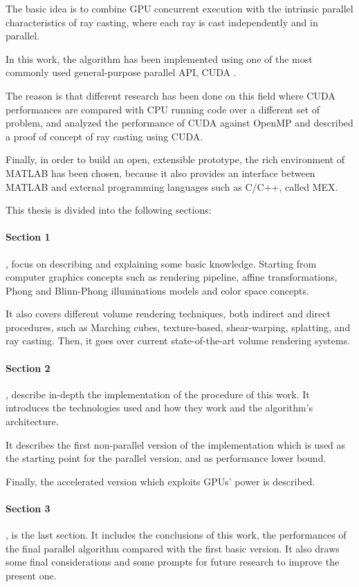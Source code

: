 \documentclass[12pt,a4paper]{extarticle}
\newcommand{\linespace}{\vspace{0pt}}
\begin{document}
The basic idea is to combine GPU concurrent execution with the intrinsic parallel characteristics of ray casting, where each ray is cast independently and in parallel.
\linespace

In this work, the algorithm has been implemented using one of the most commonly used general-purpose parallel API, CUDA \cite{nvidia:12}.

The reason is that different research has been done on this field where CUDA performances are compared with CPU running code over a different set of problem, \cite{garland:8}
and \cite{shen:9} analyzed the performance of CUDA against OpenMP and described a proof of concept of ray casting using CUDA.
\linespace

Finally, in order to build an open, extensible prototype, the rich environment of MATLAB has been chosen, because it also provides an interface between MATLAB and external programming languages such as C/C++, called MEX.
\linespace

This thesis is divided into the following sections:
\paragraph{Section 1}, focus on describing and explaining some basic knowledge. Starting from computer graphics concepts such as rendering pipeline, affine transformations, Phong and Blinn-Phong illuminations models and color space concepts.

It also covers different volume rendering techniques, both indirect and direct procedures, such as Marching cubes, texture-based, shear-warping, splatting, and ray casting. Then, it goes over current state-of-the-art volume rendering systems. 
 
 \paragraph{Section 2}, describe in-depth the implementation of the procedure of this work. It introduces the technologies used and how they work and the algorithm's architecture.
 
It describes the first non-parallel version of the implementation which is used as the starting point for the parallel version, and as performance lower bound.

Finally, the accelerated version which exploits GPUs' power is described.

\paragraph{Section 3}, is the last section. It includes the conclusions of this work, the performances of the final parallel algorithm compared with the first basic version. It also draws some final considerations and some prompts for future research to improve the present one.
\pagebreak
\fancyhead[L]{\nouppercase{\leftmark}}
\end{document}
